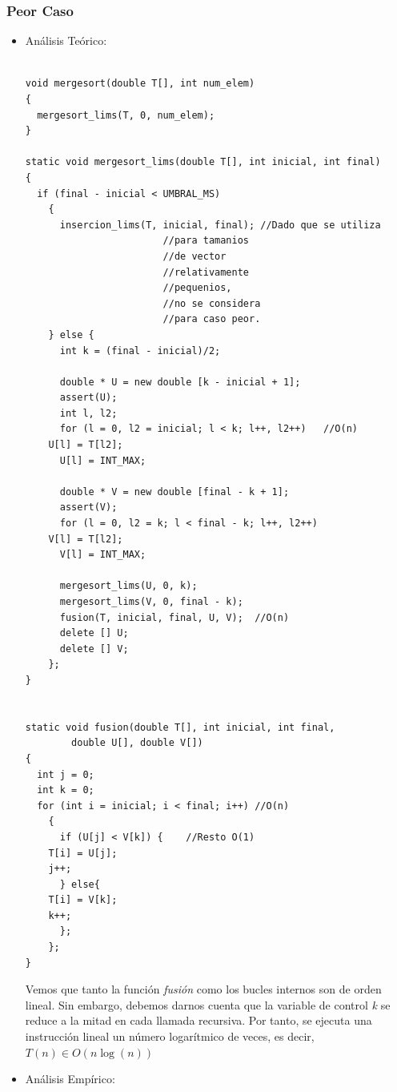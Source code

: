 \documentclass[a4paper,12pt,twoside]{article} %
\begin{document}
	\subsubsection{Peor Caso}
	\begin{itemize}
	
		\item Análisis Teórico:
		
		\lstset{language=C++}
	\begin{lstlisting}
	
void mergesort(double T[], int num_elem)
{
  mergesort_lims(T, 0, num_elem);
}

static void mergesort_lims(double T[], int inicial, int final)
{
  if (final - inicial < UMBRAL_MS)
    {
      insercion_lims(T, inicial, final); //Dado que se utiliza
      					//para tamanios 
      					//de vector 
      					//relativamente 
      					//pequenios,  
      					//no se considera 
      					//para caso peor.
    } else {
      int k = (final - inicial)/2;

      double * U = new double [k - inicial + 1];
      assert(U);
      int l, l2;
      for (l = 0, l2 = inicial; l < k; l++, l2++)	//O(n)
	U[l] = T[l2];
      U[l] = INT_MAX;

      double * V = new double [final - k + 1];
      assert(V);
      for (l = 0, l2 = k; l < final - k; l++, l2++)
	V[l] = T[l2];
      V[l] = INT_MAX;

      mergesort_lims(U, 0, k);
      mergesort_lims(V, 0, final - k);
      fusion(T, inicial, final, U, V);	//O(n)
      delete [] U;
      delete [] V;
    };
}
  

static void fusion(double T[], int inicial, int final, 
		double U[], double V[])
{
  int j = 0;
  int k = 0;
  for (int i = inicial; i < final; i++)	//O(n)
    {
      if (U[j] < V[k]) {	//Resto O(1)
	T[i] = U[j];
	j++;
      } else{
	T[i] = V[k];
	k++;
      };
    };
}

	\end{lstlisting}
	
	 Vemos que tanto la función \textit{fusión} como los bucles internos son de orden lineal. Sin embargo, debemos darnos cuenta que la variable de control \textit{k} se reduce a la mitad en cada llamada recursiva. Por tanto, se ejecuta una instrucción lineal un número logarítmico de veces, es decir, $T(n) \in O(n \log{(n)})$
	 
\newpage
	 
		\item Análisis Empírico:
		

\end{itemize}
\end{document}

